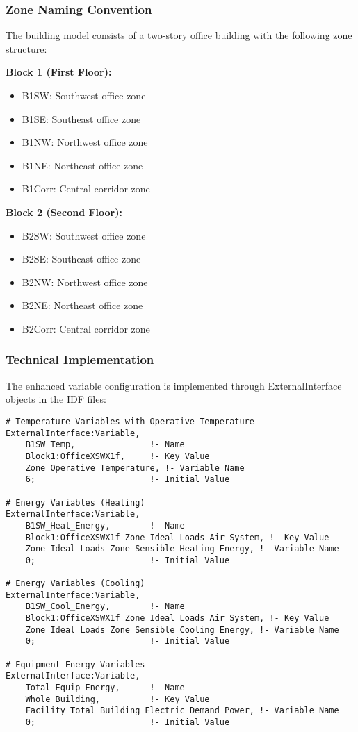\documentclass[12pt,a4paper]{article}
\begin{document}
\subsubsection{Zone Naming Convention}

The building model consists of a two-story office building with the following zone structure:

\textbf{Block 1 (First Floor):}
\begin{itemize}
    \item B1SW: Southwest office zone
    \item B1SE: Southeast office zone  
    \item B1NW: Northwest office zone
    \item B1NE: Northeast office zone
    \item B1Corr: Central corridor zone
\end{itemize}

\textbf{Block 2 (Second Floor):}
\begin{itemize}
    \item B2SW: Southwest office zone
    \item B2SE: Southeast office zone
    \item B2NW: Northwest office zone
    \item B2NE: Northeast office zone
    \item B2Corr: Central corridor zone
\end{itemize}

\subsubsection{Technical Implementation}

The enhanced variable configuration is implemented through ExternalInterface objects in the IDF files:

\begin{lstlisting}[style=python, caption=Enhanced Variable Configuration Example]
# Temperature Variables with Operative Temperature
ExternalInterface:Variable,
    B1SW_Temp,               !- Name
    Block1:OfficeXSWX1f,     !- Key Value
    Zone Operative Temperature, !- Variable Name
    6;                       !- Initial Value

# Energy Variables (Heating)
ExternalInterface:Variable,
    B1SW_Heat_Energy,        !- Name
    Block1:OfficeXSWX1f Zone Ideal Loads Air System, !- Key Value
    Zone Ideal Loads Zone Sensible Heating Energy, !- Variable Name
    0;                       !- Initial Value

# Energy Variables (Cooling)
ExternalInterface:Variable,
    B1SW_Cool_Energy,        !- Name
    Block1:OfficeXSWX1f Zone Ideal Loads Air System, !- Key Value
    Zone Ideal Loads Zone Sensible Cooling Energy, !- Variable Name
    0;                       !- Initial Value

# Equipment Energy Variables
ExternalInterface:Variable,
    Total_Equip_Energy,      !- Name
    Whole Building,          !- Key Value
    Facility Total Building Electric Demand Power, !- Variable Name
    0;                       !- Initial Value
\end{lstlisting}
\end{document}
